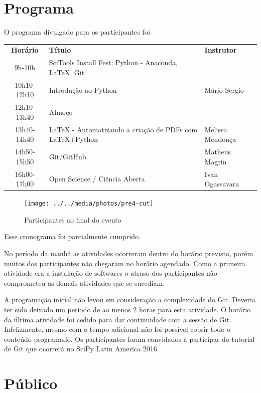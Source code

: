 \documentclass[12pt]{article}
\begin{document}
\newpage

\section*{Programa}

O programa divulgado para os participantes foi

\begin{tabular}{cp{}l}
  \textbf{Horário} & \textbf{Título} & \textbf{Instrutor} \\
  9h-10h & SciTools Install Fest: Python - Anaconda, LaTeX, Git & \\
  10h10-12h10 & Introdução ao Python & Mário Sergio \\
  12h10-13h40 & Almoço \\
  13h40-14h40 & LaTeX - Automatizando a criação de PDFs com LaTeX+Python & Melissa Mendonça \\
  14h50-15h50 & Git/GitHub & Matheus Magrin \\
  16h00-17h00 & Open Science / Ciência Aberta & Ivan Ogassavara \\
\end{tabular}

\begin{figure}[!htb]
\texttt{[image: ../../media/photos/pre4-cut]}
\caption{Participantes ao final do evento}
\end{figure}

Esse cronograma foi parcialmente cumprido.

No período da manhã as atividades ocorreram dentro do horário previsto, porém muitos dos participantes
não chegaram no horário agendado. Como a primeira atividade era a instalação de
softwares o atraso dos participantes não comprometeu as demais atividades que se
sucediam.

A programação inicial não levou em consideração a complexidade do Git.
Deveria ter sido deixado um período de ao menos 2 horas para esta atividade.
O horário da última atividade foi cedido para dar continuidade com a sessão de
Git. Infelizmente, mesmo com o tempo adicional não foi possível cobrir todo o
conteúdo programado. Os participantes foram convidados à participar do tutorial
de Git que ocorrerá no SciPy Latin America 2016.

\newpage

\section*{Público}
\end{document}
